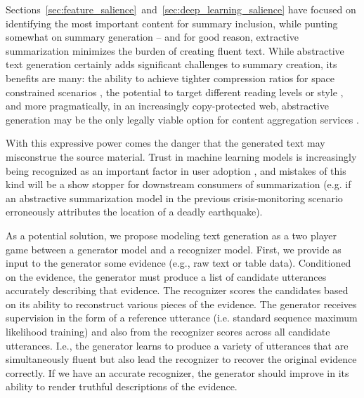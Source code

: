 Sections~\ref{sec:feature_salience}~and~\ref{sec:deep_learning_salience}
have focused on identifying the most important content for summary inclusion,
while punting somewhat on summary generation -- and for good reason, 
extractive summarization minimizes the burden of creating fluent text. 
While abstractive text generation certainly adds significant challenges to 
summary creation, 
its benefits are many: the ability to achieve tighter compression ratios
for space constrained scenarios \citep{fan2017controllable}, the potential
to target different reading levels \citep{margarido2008automatic}
or style \citep{shen2017style}, and more pragmatically, in
an increasingly copy-protected web, abstractive generation may be the only 
legally viable option for content aggregation services 
\citep{kassam2014google}.

With this expressive power comes the danger that the generated text may
misconstrue the source material. Trust in machine learning
models is increasingly being recognized as an important factor in user 
adoption \citep{ribeiro2016should}, and mistakes of this kind will be 
a show stopper for downstream consumers of summarization (e.g. if an
abstractive summarization model in the previous crisis-monitoring scenario
erroneously attributes the location of a deadly earthquake). 



As a potential solution,
we propose modeling text generation as a two player game between a generator
model and a recognizer model. %
First, we provide as input to the 
generator some evidence (e.g., raw text or table data). 
Conditioned on the evidence, the generator must produce 
a list of candidate utterances accurately describing that evidence. The recognizer
scores the candidates based on its ability to reconstruct various 
pieces of the evidence. The generator receives supervision in the form of a 
reference utterance (i.e. standard sequence maximum likelihood training) 
and also from the recognizer scores across all candidate
utterances.
I.e., the generator learns to produce a variety of utterances that are
simultaneously fluent but also lead the recognizer to recover the original
evidence correctly. If we have an accurate recognizer, the generator should
improve in its ability to render truthful descriptions of the evidence.





